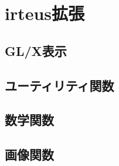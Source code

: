 \section{irteus拡張}
 \subsection{GL/X表示}
  
  
 \subsection{ユーティリティ関数}
 
 
 \subsection{数学関数}
 
 \subsection{画像関数}
 
 

